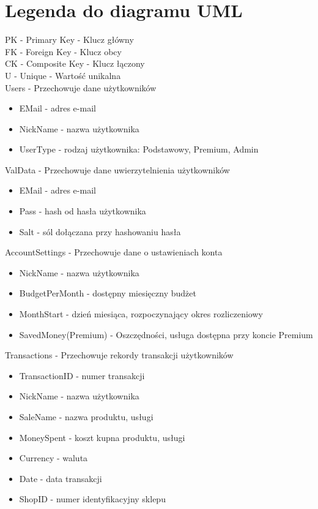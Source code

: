\documentclass{article}
\begin{document}
    \section{Legenda do diagramu UML}
    PK - Primary Key - Klucz główny
    \\FK - Foreign Key - Klucz obcy
    \\CK - Composite Key - Klucz łączony
    \\U - Unique - Wartość unikalna
    \\Users - Przechowuje dane użytkowników
    \begin{itemize}
    \item EMail - adres e-mail
    \item NickName - nazwa użytkownika
    \item UserType - rodzaj użytkownika: Podstawowy, Premium, Admin
    \end{itemize}
    ValData - Przechowuje dane uwierzytelnienia użytkowników
    \begin{itemize}
    \item EMail - adres e-mail
    \item Pass - hash od hasła użytkownika
    \item Salt - sól dołączana przy hashowaniu hasła
    \end{itemize}
    AccountSettings - Przechowuje dane o ustawieniach konta
    \begin{itemize}
    \item NickName - nazwa użytkownika
    \item BudgetPerMonth - dostępny miesięczny budżet
    \item MonthStart - dzień miesiąca, rozpoczynający okres rozliczeniowy
    \item SavedMoney(Premium) - Oszczędności, usługa dostępna przy koncie Premium
    \end{itemize}
    Transactions - Przechowuje rekordy transakcji użytkowników
    \begin{itemize}
    \item TransactionID - numer transakcji
    \item NickName - nazwa użytkownika
    \item SaleName - nazwa produktu, usługi
    \item MoneySpent - koszt kupna produktu, usługi
    \item Currency - waluta
    \item Date - data transakcji
    \item ShopID - numer identyfikacyjny sklepu
    \end{itemize}
\end{document}
